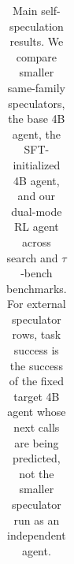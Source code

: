 \begin{table}[!t]
{\begin{tabular}{@{}l|cc|cc|cc|cc|cc|cc@{}}
\midrule
\bottomrule
\end{tabular}
}
\caption{Main self-speculation results. We compare smaller same-family
speculators, the base 4B agent, the SFT-initialized 4B agent, and our dual-mode
RL agent across search and $\tau$-bench benchmarks. For external speculator
rows, task success is the success of the fixed target 4B agent whose next calls
are being predicted, not the smaller speculator run as an independent agent.}
\label{tab:main-self-speculation}
\vspace{-0.2in}
\end{table}
